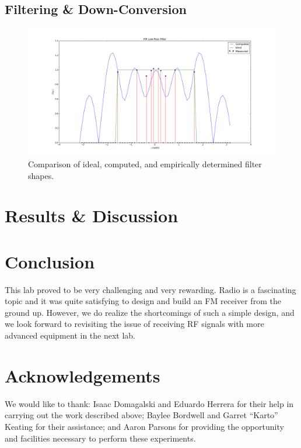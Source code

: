 \documentclass[11pt]{article}
\begin{document}
    \subsection{Filtering \& Down-Conversion}

    \begin{figure}[H]
        \centering
            \includegraphics[width = \textwidth]{3_2_1_filter.png}
        \caption{Comparison of ideal, computed, and empirically determined filter shapes.}
        \label{filter}
    \end{figure}


\section{Results \& Discussion}


\section{Conclusion}
This lab proved to be very challenging and very rewarding. Radio is a fascinating topic and it was quite satisfying to design and build an FM receiver from the ground up. However, we do realize the shortcomings of such a simple design, and we look forward to revisiting the issue of receiving RF signals with more advanced equipment in the next lab.

\section{Acknowledgements}
We would like to thank: Isaac Domagalski and Eduardo Herrera for their help in carrying out the work described above; Baylee Bordwell and Garret ``Karto'' Keating for their assistance; and Aaron Parsons for providing the opportunity and facilities necessary to perform these experiments.
\end{document}
